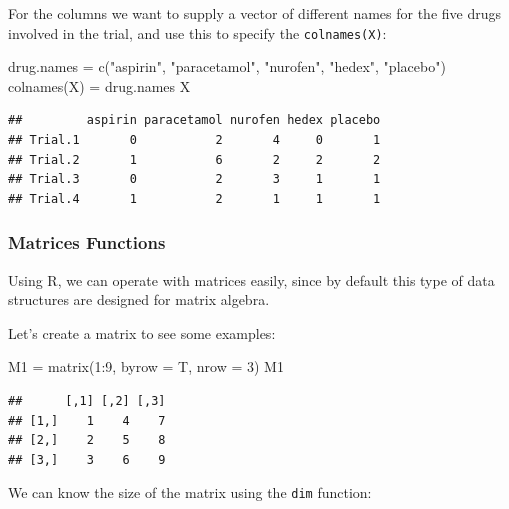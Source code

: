 \documentclass[
]{book}
\newenvironment{Shaded}{\begin{snugshade}}{\end{snugshade}}
\newcommand{\AttributeTok}[1]{\textcolor[rgb]{0.77,0.63,0.00}{#1}}
\newcommand{\DecValTok}[1]{\textcolor[rgb]{0.00,0.00,0.81}{#1}}
\newcommand{\FunctionTok}[1]{\textcolor[rgb]{0.00,0.00,0.00}{#1}}
\newcommand{\NormalTok}[1]{#1}
\newcommand{\OtherTok}[1]{\textcolor[rgb]{0.56,0.35,0.01}{#1}}
\newcommand{\SpecialCharTok}[1]{\textcolor[rgb]{0.00,0.00,0.00}{#1}}
\newcommand{\StringTok}[1]{\textcolor[rgb]{0.31,0.60,0.02}{#1}}
\theoremstyle{definition}
\theoremstyle{definition}
\theoremstyle{definition}
\theoremstyle{definition}
\theoremstyle{remark}
\begin{document}
For the columns we want to supply a vector of different names for the five drugs involved in the trial, and use this to specify the \texttt{colnames(X)}:

\begin{Shaded}
\begin{Highlighting}[]
\NormalTok{drug.names }\OtherTok{=} \FunctionTok{c}\NormalTok{(}\StringTok{"aspirin"}\NormalTok{, }\StringTok{"paracetamol"}\NormalTok{, }\StringTok{"nurofen"}\NormalTok{, }\StringTok{"hedex"}\NormalTok{, }\StringTok{"placebo"}\NormalTok{)}
\FunctionTok{colnames}\NormalTok{(X) }\OtherTok{=}\NormalTok{ drug.names}
\NormalTok{X}
\end{Highlighting}
\end{Shaded}

\begin{verbatim}
##         aspirin paracetamol nurofen hedex placebo
## Trial.1       0           2       4     0       1
## Trial.2       1           6       2     2       2
## Trial.3       0           2       3     1       1
## Trial.4       1           2       1     1       1
\end{verbatim}

\hypertarget{matrices-functions}{%
\subsubsection{Matrices Functions}\label{matrices-functions}}

Using R, we can operate with matrices easily, since by default this type of data structures are designed for matrix algebra.

Let's create a matrix to see some examples:

\begin{Shaded}
\begin{Highlighting}[]
\NormalTok{M1 }\OtherTok{=} \FunctionTok{matrix}\NormalTok{(}\DecValTok{1}\SpecialCharTok{:}\DecValTok{9}\NormalTok{, }\AttributeTok{byrow =}\NormalTok{ T, }\AttributeTok{nrow =} \DecValTok{3}\NormalTok{)}
\NormalTok{M1}
\end{Highlighting}
\end{Shaded}

\begin{verbatim}
##      [,1] [,2] [,3]
## [1,]    1    4    7
## [2,]    2    5    8
## [3,]    3    6    9
\end{verbatim}

We can know the size of the matrix using the \texttt{dim} function:
\end{document}
